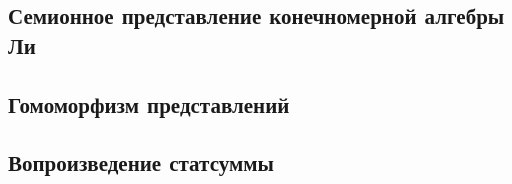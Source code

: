 \begin{appendices}
	\chapter{Семионное представление конечномерной алгебры Ли} \label{App_Semion}
	\section{Гомоморфизм представлений}
	\section{Вопроизведение статсуммы}
\end{appendices}